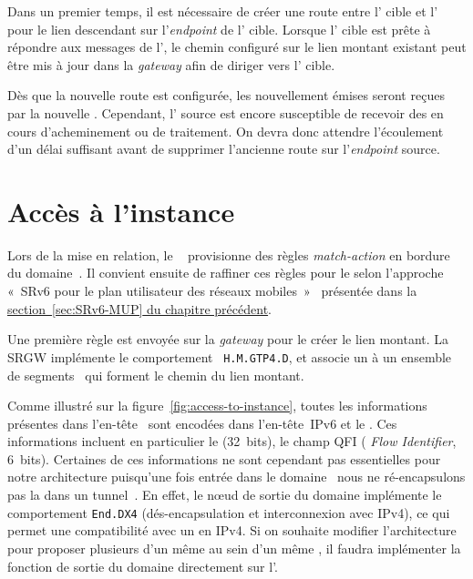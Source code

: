 \documentclass[../main.tex]{subfiles}
\begin{document}
Dans un premier temps, il est nécessaire de créer une route entre l’ cible et l’ pour le lien descendant sur l’\textit{endpoint} de l’ cible.
Lorsque l’ cible est prête à répondre aux messages de l’, le chemin configuré sur le lien montant existant peut être mis à jour dans la \textit{gateway} afin de diriger vers l’ cible.

Dès que la nouvelle route est configurée, les  nouvellement émises seront reçues par la nouvelle .
Cependant, l’ source est encore susceptible de recevoir des  en cours d’acheminement ou de traitement.
On devra donc attendre l’écoulement d’un délai suffisant avant de supprimer l’ancienne route sur l’\textit{endpoint} source.


\section{Accès à l’instance}
\label{sec:sr4mec-access}
Lors de la mise en relation, le ~ provisionne des règles \textit{match-action} en bordure du domaine~.
Il convient ensuite de raffiner ces règles pour le  selon l’approche « SRv6 pour le plan utilisateur des réseaux mobiles »~\cite{rfc9433} présentée dans la \hyperref[sec:SRv6-MUP]{section~\ref*{sec:SRv6-MUP} du chapitre précédent}.

Une première règle est envoyée sur la \textit{gateway} pour le créer le lien montant.
La SRGW implémente le comportement~ \texttt{H.M.GTP4.D}, et associe un  à un ensemble de segments~ qui forment le chemin du lien montant.

Comme illustré sur la figure~\ref{fig:access-to-instance}, toutes les informations présentes dans l’en-tête~ sont encodées dans l’en-tête~IPv6 et le .
Ces informations incluent en particulier le  (32~bits), le champ QFI (\textit{ Flow Identifier}, 6~bits).
Certaines de ces informations ne sont cependant pas essentielles pour notre architecture puisqu’une fois entrée dans le domaine~ nous ne ré-encapsulons pas la  dans un tunnel~.
En effet, le nœud de sortie du domaine implémente le comportement \texttt{End.DX4} (dés-encapsulation et interconnexion avec IPv4), ce qui permet une compatibilité avec un  en IPv4.
Si on souhaite modifier l’architecture pour proposer plusieurs  d’un même  au sein d’un même , il faudra implémenter la fonction de sortie du domaine directement sur l’.
\end{document}
